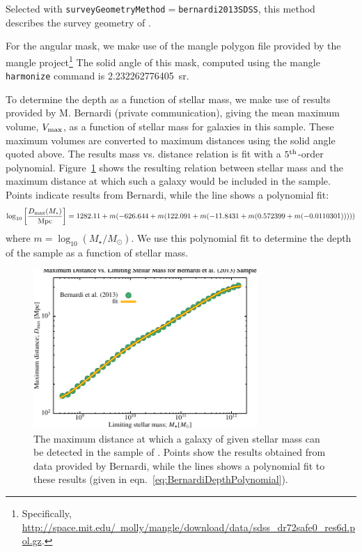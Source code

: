 Selected with {\tt surveyGeometryMethod}$=${\tt bernardi2013SDSS}, this method describes the survey geometry of \cite{bernardi_massive_2013}. 

For the angular mask, we make use of the \gls{mangle} polygon file provided by the \gls{mangle} project\footnote{Specifically, \href{http://space.mit.edu/~molly/mangle/download/data/sdss_dr72safe0_res6d.pol.gz}{http://space.mit.edu/~molly/mangle/download/data/sdss\_dr72safe0\_res6d.pol.gz}.} The solid angle of this mask, computed using the \gls{mangle} {\tt harmonize} command is 2.232262776405~sr.

To determine the depth as a function of stellar mass, we make use of results provided by M. Bernardi (private communication), giving the mean maximum volume, $V_{\rm max}$, as a function of stellar mass for galaxies in this sample. These maximum volumes are converted to maximum distances using the solid angle quoted above. The results mass vs. distance relation is fit with a $5^{\rm th}$-order polynomial. Figure~\ref{fig:BernardiSDSSDepthFit} shows the resulting relation between stellar mass and the maximum distance at which such a galaxy would be included in the sample. Points indicate results from Bernardi, while the line shows a polynomial fit:
\begin{equation}
 \log_{10} \left[ {D_{\rm max}(M_\star) \over \hbox{Mpc}}\right] = 1282.11+m (-626.644+m (122.091+m (-11.8431+m (0.572399+m (-0.0110301)))))
 \label{eq:BernardiDepthPolynomial}
\end{equation}
where $m= \log_{10}(M_\star/M_\odot)$. We use this polynomial fit to determine the depth of the sample as a function of stellar mass.

\begin{figure}
 \begin{center}
 \includegraphics[width=85mm,trim=0mm 0mm 0mm 4mm,clip]{Plots/DataAnalysis/BernardiSDSSMassLuminosityRelation.pdf}
 \end{center}
 \caption{The maximum distance at which a galaxy of given stellar mass can be detected in the sample of \protect\cite{bernardi_massive_2013}. Points show the results obtained from data provided by Bernardi, while the lines shows a polynomial fit to these results (given in eqn.~\ref{eq:BernardiDepthPolynomial}).}
 \label{fig:BernardiSDSSDepthFit}
\end{figure}


